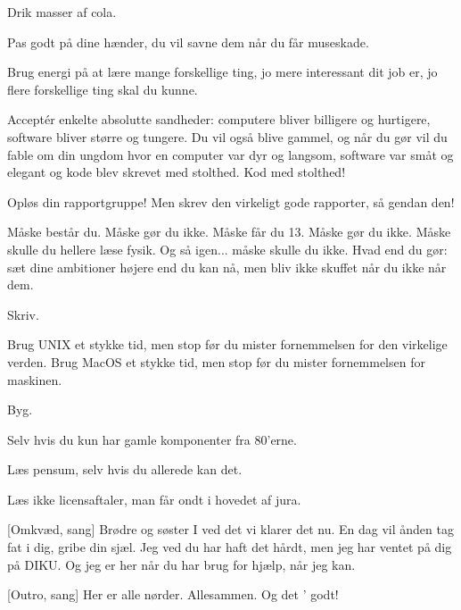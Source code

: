 \documentclass[a4paper,12pt]{article}
\begin{document}
\begin{sketch}
\begin{noindent}
 Drik masser af cola.

 Pas godt på dine hænder,
        du vil savne dem når du får museskade.

 Brug energi på at lære mange forskellige ting,
        jo mere interessant dit job er, jo flere forskellige ting skal du kunne.

 Acceptér enkelte absolutte sandheder:
        computere bliver billigere og hurtigere,
        software bliver større og tungere.
        Du vil også blive gammel,
        og når du gør
        vil du fable om din ungdom
        hvor en computer var dyr og langsom,
        software var småt og elegant
        og kode blev skrevet med stolthed.
        Kod med stolthed!

 Opløs din rapportgruppe!
        Men skrev den virkeligt gode rapporter, så gendan den!

 Måske består du.
        Måske gør du ikke.
        Måske får du 13.
        Måske gør du ikke.
        Måske skulle du hellere læse fysik.
        Og så igen... måske skulle du ikke.
        Hvad end du gør:
        sæt dine ambitioner højere end du kan nå,
        men bliv ikke skuffet når du ikke når dem.

 Skriv.

 Brug UNIX et stykke tid,
        men stop før du mister fornemmelsen for den virkelige verden.
        Brug MacOS et stykke tid,
        men stop før du mister fornemmelsen for maskinen.

 Byg.
        
 Selv hvis du kun har gamle komponenter fra 80'erne.

 Læs pensum,
        selv hvis du allerede kan det.

 Læs ikke licensaftaler,
        man får ondt i hovedet af jura.

[Omkvæd, sang]
        Brødre og søster I ved det vi klarer det nu.
        En dag vil ånden tag fat i dig, gribe din sjæl.
        Jeg ved du har haft det hårdt, men jeg har ventet på dig på DIKU.
        Og jeg er her når du har brug for hjælp,
        når jeg kan.
        
[Outro, sang]
        Her er alle nørder.
        Allesammen.
        Og det ' godt!

\end{noindent}

\end{sketch}
\end{document}
